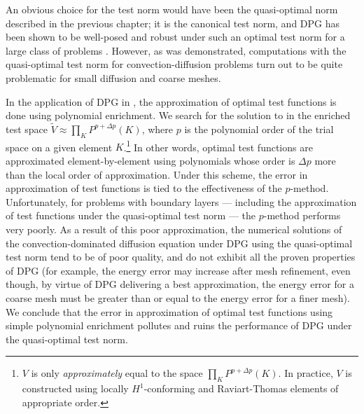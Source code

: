 An obvious choice for the test norm would have been the quasi-optimal norm described in the previous chapter; it is the canonical test norm, and DPG has been shown to be well-posed and robust under such an optimal test norm for a large class of problems \cite{DPGrobustness,Bui-ThanhDemkowiczGhattas11b, stokesDPG}. However, as was demonstrated, computations with the quasi-optimal test norm for convection-diffusion problems turn out to be quite problematic for small diffusion and coarse meshes.  

%
In the application of DPG in \cite{DPG1,DPG2,DPG3,DPG4}, the approximation of optimal test functions is done using polynomial enrichment. We search for the solution to  in the enriched test space $\tilde{V} \approx \prod_{K} P^{p+\Delta p}(K)$, where $p$ is the polynomial order of the trial space on a given element $K$.\footnote{$V$ is only \emph{approximately} equal to the space $\prod_{K} P^{p+\Delta p}(K)$. In practice, $V$ is constructed using locally $H^1$-conforming and Raviart-Thomas elements of appropriate order.}  In other words, optimal test functions are approximated element-by-element using polynomials whose order is $\Delta p$ more than the local order of approximation.  Under this scheme, the error in approximation of test functions is tied to the effectiveness of the $p$-method.  Unfortunately, for problems with boundary layers --- including the approximation of test functions under the quasi-optimal test norm --- the $p$-method performs very poorly. As a result of this poor approximation, the numerical solutions of the convection-dominated diffusion equation under DPG using the quasi-optimal test norm tend to be of poor quality, and do not exhibit all the proven properties of DPG (for example, the energy error may increase after mesh refinement, even though, by virtue of DPG delivering a best approximation, the energy error for a coarse mesh must be greater than or equal to the energy error for a finer mesh).  We conclude that the error in approximation of optimal test functions using simple polynomial enrichment pollutes and ruins the performance of DPG under the quasi-optimal test norm. 

